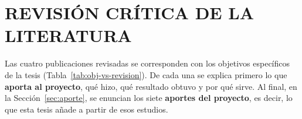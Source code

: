 
\chapter{REVISIÓN CRÍTICA DE LA LITERATURA}
\label{cap:revision}

Las cuatro publicaciones revisadas se corresponden con los objetivos específicos
de la tesis (Tabla~\ref{tab:obj-vs-revision}). De cada una se explica primero lo
que \textbf{aporta al proyecto}, qué hizo, qué resultado obtuvo y por qué sirve.
Al final, en la Sección~\ref{sec:aporte}, se enuncian los siete \textbf{aportes
del proyecto}, es decir, lo que esta tesis añade a partir de esos estudios.

